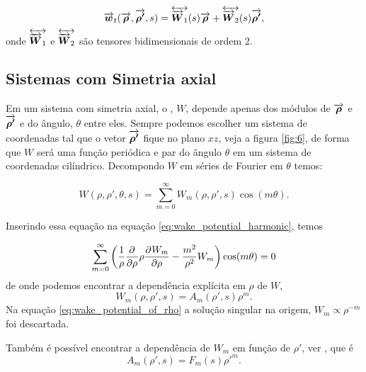 \begin{equation}
	\overrightarrow{\boldsymbol{w}}_t(\overrightarrow{\boldsymbol{\rho}},\overrightarrow{\boldsymbol{\rho'}},s) = \overleftrightarrow{\overrightarrow{\boldsymbol{W}}_1}(s)\overrightarrow{\boldsymbol{\rho}} +
    										 \overleftrightarrow{\overrightarrow{\boldsymbol{W}}_2}(s)\overrightarrow{\boldsymbol{\rho'}},
\end{equation}
onde $\overleftrightarrow{\overrightarrow{\boldsymbol{W}}_1}$ e $\overleftrightarrow{\overrightarrow{\boldsymbol{W}}_2}$ são tensores bidimensionais de ordem 2. 

\subsection{Sistemas com Simetria axial}

Em um sistema com simetria axial, o , $W$, depende apenas dos módulos de $\overrightarrow{\boldsymbol{\rho}}$ e $\overrightarrow{\boldsymbol{\rho'}}$ e do ângulo, $\theta$ entre eles. Sempre podemos escolher um sistema de coordenadas tal que o vetor $\overrightarrow{\boldsymbol{\rho'}}$ fique no plano $xz$, veja a figura \ref{fig:6}, de forma que $W$ será uma função periódica e par  do ângulo $\theta$ em um sistema de coordenadas cilíndrico. Decompondo $W$ em séries de Fourier em $\theta$ temos:

\begin{equation}
	W(\rho,\rho',\theta,s) = \sum_{m=0}^\infty W_m (\rho,\rho',s) \cos(m\theta).
\end{equation}

Inserindo essa equação na equação \eqref{eq:wake_potential_harmonic}, temos

\begin{equation}
	\sum_{m=0}^\infty \left(\frac1\rho\frac{\partial^{{}}}{\partial \rho^{{}}}\rho\frac{\partial^{{}}W_m}{\partial \rho^{{}}} - 
    					    \frac{m^2}{\rho^2}W_m\right)\cos(m\theta) = 0
\end{equation}
de onde podemos encontrar a dependência explícita em $\rho$ de $W$,
\begin{equation}\label{eq:wake_potential_of_rho}
	W_m(\rho,\rho',s) = A_m(\rho',s)\rho^m.
\end{equation}
Na equação \eqref{eq:wake_potential_of_rho} a solução singular na origem, $W_m \propto \rho^{-m}$ foi descartada.

Também é possível encontrar a dependência de $W_m$ em função de $\rho'$,  ver \cite{Bane_PAC1983}, que é
\begin{equation}
	A_m(\rho',s) = F_m(s)\rho'^m.
\end{equation}

